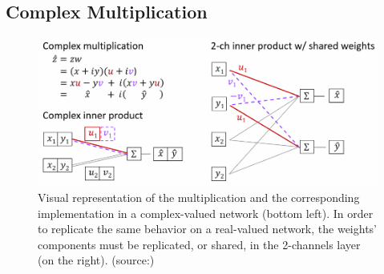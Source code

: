 \documentclass[../main.tex]{subfiles}
\begin{document}
 
\subsection*{Complex Multiplication}
\label{subsec:cmplx_multiplication}

\begin{figure}[!ht]
	\centering
	\includegraphics[width=\textwidth]{pictures/cmplx_multiplication.pdf}
	\caption{Visual representation of the multiplication and the corresponding implementation in a complex-valued network (bottom left). In order to replicate the same behavior on a real-valued network, the weights' components must be replicated, or shared, in the 2-channels layer (on the right). (source:\cite{Virtue:EECS-2019-126})}
	\label{fig:cmplx_multiplication}
\end{figure}
\end{document}
